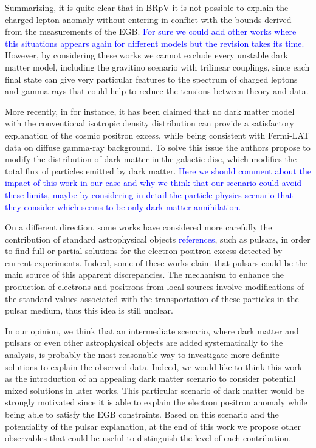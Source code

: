 \documentclass[a4paper,11pt]{article}
\newcommand*{\blue}{\textcolor{blue}}
\begin{document}
Summarizing, it is quite clear that in BRpV it is not possible to explain the charged lepton anomaly without entering in conflict with the bounds derived from the measurements of the EGB. \blue{For sure we could add other works where this situations appears again for different models but the revision takes its time.} However, by considering these works we cannot exclude every unstable dark matter model, including the gravitino scenario with trilinear couplings, since each final state can give very particular features to the spectrum of charged leptons and gamma-rays that could help to reduce the tensions between theory and data.

More recently, in \cite{Belotsky:2016tja} for instance, it has been claimed that no dark matter model with the conventional isotropic density distribution can provide a satisfactory explanation of the cosmic positron excess, while being consistent with Fermi-LAT data on diffuse gamma-ray background. To solve this issue the authors propose to modify the distribution of dark matter in the galactic disc, which modifies the total flux of particles emitted by dark matter. \blue{Here we should comment about the impact of this work in our case and why we think that our scenario could avoid these limits, maybe by considering in detail the particle physics scenario that they consider which seems to be only dark matter annihilation.}

On a different direction, some works have considered more carefully the contribution of standard astrophysical objects \blue{references}, such as pulsars, in order
to find full or partial solutions for the electron-positron excess detected by current experiments. Indeed, some of these works claim that pulsars could be the main source of this apparent discrepancies. The mechanism to enhance the production of electrons and positrons from local sources involve modifications of the standard values associated with the transportation of these particles in the pulsar medium, thus this idea is still unclear. 

In our opinion, we think that an intermediate scenario, where dark matter and pulsars or even other astrophysical objects are added systematically to the analysis, is probably the most reasonable way to investigate more definite solutions to explain the observed data. Indeed, we would like to think this work as the introduction of an appealing dark matter scenario to consider potential mixed solutions in later works. This particular scenario of dark matter would be strongly motivated since it is able to explain the electron positron anomaly while being able to satisfy the EGB constraints. Based on this scenario and the potentiality of the pulsar explanation, at the end of this work we propose other observables that could be useful to distinguish the level of each contribution. 
\end{document}
